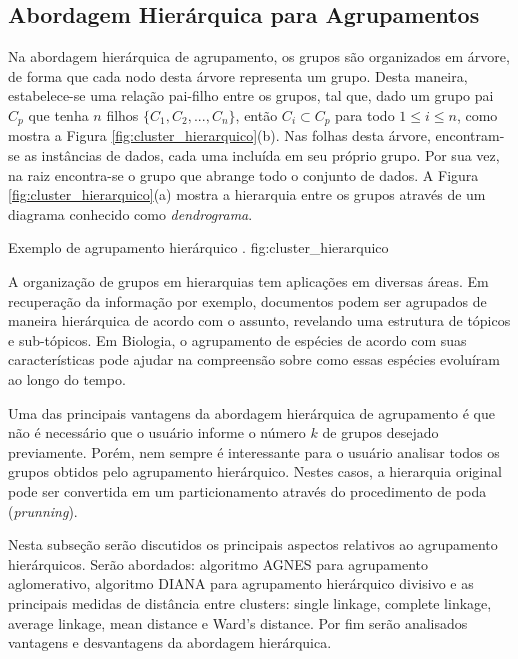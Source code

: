 \subsection{Abordagem Hierárquica para Agrupamentos}
	\label{subsec:abordagem_hierarquica}
	
Na abordagem hierárquica de agrupamento, os grupos são organizados em árvore, de
forma que cada nodo desta árvore representa um grupo. Desta maneira,
estabelece-se uma relação pai-filho entre os grupos, tal que, dado um grupo pai
$C_p$ que tenha $n$ filhos $\{C_1, C_2,...,C_n\}$, então $C_i \subset C_p$ para
todo $1 \leq i \leq n$, como mostra a Figura \ref{fig:cluster_hierarquico}(b).
Nas folhas desta árvore, encontram-se as instâncias de dados, cada uma incluída
em seu próprio grupo. Por sua vez, na raiz encontra-se o grupo que abrange todo
o conjunto de dados. A Figura \ref{fig:cluster_hierarquico}(a) mostra a
hierarquia entre os grupos através de um diagrama conhecido como
\emph{dendrograma}.

{Exemplo de agrupamento hierárquico \cite{tan2009introducao}.}
{fig:cluster_hierarquico}

A organização de grupos em hierarquias tem aplicações em diversas áreas. Em 
recuperação da informação por exemplo, documentos podem ser agrupados de maneira
hierárquica de acordo com o assunto, revelando uma estrutura de tópicos e
sub-tópicos. Em Biologia, o agrupamento de espécies de acordo com suas
características pode ajudar na compreensão sobre como essas espécies evoluíram
ao longo do tempo.

Uma das principais vantagens da abordagem hierárquica de agrupamento é que não
é necessário que o usuário informe o número $k$ de grupos desejado previamente.
Porém, nem sempre é interessante para o usuário analisar todos os grupos obtidos
pelo agrupamento hierárquico. Nestes casos, a hierarquia original pode ser
convertida em um particionamento através do procedimento de poda
(\emph{prunning}). 

Nesta subseção serão discutidos os principais aspectos relativos ao agrupamento
hierárquicos. Serão abordados: algoritmo AGNES para agrupamento aglomerativo, 
algoritmo DIANA para agrupamento hierárquico divisivo e as principais medidas
de distância entre clusters: single linkage, complete linkage, average linkage,
mean distance e Ward's distance. Por fim serão analisados vantagens e
desvantagens da abordagem hierárquica.


